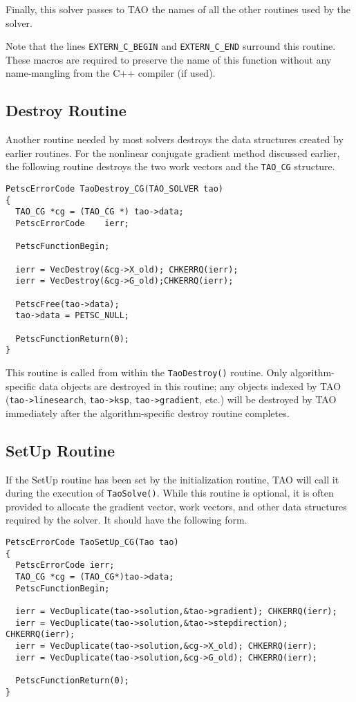 Finally, this solver passes to TAO the names of all the other routines
used by the solver.  

Note that the lines {\tt EXTERN\_C\_BEGIN} and {\tt EXTERN\_C\_END} surround
this routine.  These macros are required to preserve the name of this
function without any name-mangling from the C++ compiler (if used).

\subsection{Destroy Routine}
Another routine needed by most solvers destroys the data structures
created by earlier routines.  For the nonlinear conjugate gradient
method discussed earlier, the following routine destroys the two
work vectors and the {\tt TAO\_CG} structure.
\begin{verbatim}
PetscErrorCode TaoDestroy_CG(TAO_SOLVER tao)
{
  TAO_CG *cg = (TAO_CG *) tao->data;
  PetscErrorCode    ierr;

  PetscFunctionBegin;

  ierr = VecDestroy(&cg->X_old); CHKERRQ(ierr);
  ierr = VecDestroy(&cg->G_old);CHKERRQ(ierr);

  PetscFree(tao->data);
  tao->data = PETSC_NULL;

  PetscFunctionReturn(0);
}
\end{verbatim}
This routine is called from within the {\tt TaoDestroy()} routine.
Only algorithm-specific data objects are destroyed in this
routine; any objects indexed by TAO ({\tt tao->linesearch}, {\tt tao->ksp}, {\tt tao->gradient}, etc.)
will be destroyed by TAO immediately after the algorithm-specific destroy 
routine completes.


\subsection{SetUp Routine}
If the SetUp routine has been set by the initialization routine, TAO
will call it during the execution of \texttt{TaoSolve()}.
While this routine is optional, it is often provided to allocate
the gradient vector, work vectors, and other data structures 
required by the solver.
It should have the following form.
\begin{verbatim}
PetscErrorCode TaoSetUp_CG(Tao tao)
{
  PetscErrorCode ierr;
  TAO_CG *cg = (TAO_CG*)tao->data;
  PetscFunctionBegin;

  ierr = VecDuplicate(tao->solution,&tao->gradient); CHKERRQ(ierr);
  ierr = VecDuplicate(tao->solution,&tao->stepdirection); CHKERRQ(ierr);
  ierr = VecDuplicate(tao->solution,&cg->X_old); CHKERRQ(ierr);
  ierr = VecDuplicate(tao->solution,&cg->G_old); CHKERRQ(ierr);

  PetscFunctionReturn(0);
}
\end{verbatim}

